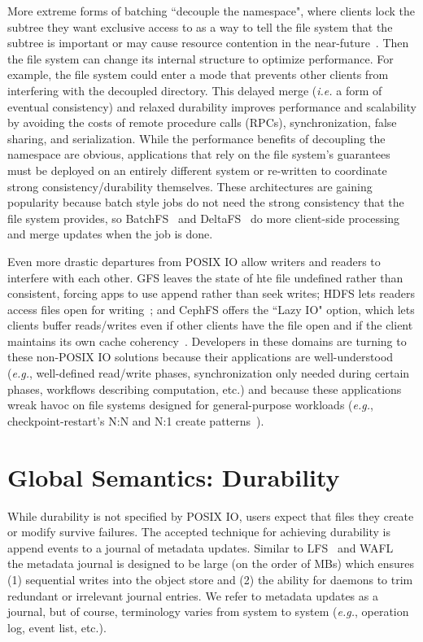 More extreme forms of batching ``decouple the namespace", where clients lock
the subtree they want exclusive access to as a way to tell the file system that
the subtree is important or may cause resource contention in the
near-future~\cite{grider:pdsw2015-marfs, zheng:pdsw2015-deltafs,
zheng:pdsw2014-batchfs, ren:sc2014-indexfs, bent:slides-twotiers}. Then the
file system can change its internal structure to optimize performance. For
example, the file system could enter a mode that prevents other clients from
interfering with the decoupled directory.  This delayed merge ({\it i.e.} a
form of eventual consistency) and relaxed durability improves performance and
scalability by avoiding the costs of remote procedure calls (RPCs),
synchronization, false sharing, and serialization.  While the performance
benefits of decoupling the namespace are obvious, applications that rely on the
file system's guarantees must be deployed on an entirely different system or
re-written to coordinate strong consistency/durability themselves.  These
architectures are gaining popularity because batch style jobs do not need the
strong consistency that the file system provides, so
BatchFS~\cite{zheng:pdsw2014-batchfs} and DeltaFS~\cite{zheng:pdsw2015-deltafs}
do more client-side processing and merge updates when the job is done.  

Even more drastic departures from POSIX IO allow writers and readers to
interfere with each other. GFS leaves the state of hte file undefined rather
than consistent, forcing apps to use append rather than seek writes; HDFS lets
readers access files open for
writing~\cite{hakimzadeh:dais14-hdfs-consistency}; and CephFS offers the ``Lazy
IO" option, which lets clients buffer reads/writes even if other clients have
the file open and if the client maintains its own cache
coherency~\cite{docs:cephcaps}.  Developers in these domains are turning to
these non-POSIX IO solutions because their applications are well-understood
({\it e.g.}, well-defined read/write phases, synchronization only needed during
certain phases, workflows describing computation, etc.) and because these
applications wreak havoc on file systems designed for general-purpose workloads
({\it e.g.}, checkpoint-restart's N:N and N:1 create
patterns~\cite{bent_plfs_2009}).

\section{Global Semantics: Durability}

While durability is not specified by POSIX IO, users expect that files they
create or modify survive failures. The accepted technique for achieving
durability is append events to a journal of metadata updates.  Similar to
LFS~\cite{rosenblum:acm1992-LFS} and WAFL~\cite{hitz:wtec1994-WAFL} the
metadata journal is designed to be large (on the order of MBs) which ensures
(1) sequential writes into the object store and (2) the ability for daemons to
trim redundant or irrelevant journal entries. We refer to metadata updates as a
journal, but of course, terminology varies from system to system ({\it e.g.},
operation log, event list, etc.). 

